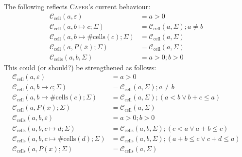 \documentclass[a4paper]{article}
\makeatletter
\newcommand{\sem}[1]{\left\llbracket#1\right\rrbracket}
\newcommand{\Set}[1]{\left\{#1\right\}}
\newcommand{\Setb}[2]{\left\{#1 \, \middle| \, \begin{array}{@{}l@{}}#2\end{array} \right\}}
\newcommand{\vctx}{\Delta}
\newcommand{\pcnds}{\Pi}
\newcommand{\preds}{\Sigma}
\newcommand{\regs}{\Xi}
\newcommand{\pvars}{\Upsilon}
\makeatother
\begin{document}

The following reflects \textsc{Caper}'s current behaviour:
\begin{align*}
  \mathcal{C}_{\mathrm{cell}}(a,\varepsilon) &= a > 0 \\
  \mathcal{C}_{\mathrm{cell}}(a,b \mapsto c ; \preds) &= \mathcal{C}_{\mathrm{cell}}(a,\preds) ; a \neq b \\
  \mathcal{C}_{\mathrm{cell}}(a,b \mapsto \mathrm{\#cells}(c) ; \preds) &= \mathcal{C}_{\mathrm{cell}}(a,\preds) \\
  \mathcal{C}_{\mathrm{cell}}(a,P(\bar{x}) ; \preds) &= \mathcal{C}_{\mathrm{cell}}(a,\preds) \\[1em]
  \mathcal{C}_{\mathrm{cells}}(a,b,\preds) &= a > 0; b > 0
\end{align*}
This could (or should?) be strengthened as follows:
\begin{align*}
  \mathcal{C}_{\mathrm{cell}}(a,\varepsilon) &= a > 0 \\
  \mathcal{C}_{\mathrm{cell}}(a,b \mapsto c ; \preds) &= \mathcal{C}_{\mathrm{cell}}(a,\preds) ; a \neq b \\
  \mathcal{C}_{\mathrm{cell}}(a,b \mapsto \mathrm{\#cells}(c) ; \preds) &= \mathcal{C}_{\mathrm{cell}}(a,\preds) ; (a < b \lor b + c \leq a) \\
  \mathcal{C}_{\mathrm{cell}}(a,P(\bar{x}) ; \preds) &= \mathcal{C}_{\mathrm{cell}}(a,\preds) \\[1em]
  \mathcal{C}_{\mathrm{cells}}(a,b,\varepsilon) &= a > 0; b > 0\\
  \mathcal{C}_{\mathrm{cells}}(a,b, c \mapsto d ; \preds) &= \mathcal{C}_{\mathrm{cells}}(a,b,\preds) ; (c < a \lor a + b \leq c) \\
  \mathcal{C}_{\mathrm{cells}}(a,b, c \mapsto \mathrm{\#cells}(d) ; \preds) &= \mathcal{C}_{\mathrm{cells}}(a,b,\preds) ; (a + b \leq c \lor c + d \leq a) \\
  \mathcal{C}_{\mathrm{cells}}(a,P(\bar{x}) ; \preds) &= \mathcal{C}_{\mathrm{cells}}(a,\preds)
\end{align*}
\end{document}
